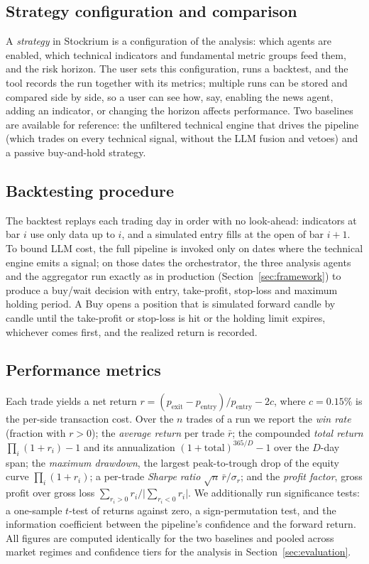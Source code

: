 \documentclass[runningheads]{llncs}
\begin{document}
\subsection{Strategy configuration and comparison}
A \emph{strategy} in Stockrium is a configuration of the analysis: which agents
are enabled, which technical indicators and fundamental metric groups feed them,
and the risk horizon. The user sets this configuration, runs a backtest, and the
tool records the run together with its metrics; multiple runs can be stored and
compared side by side, so a user can see how, say, enabling the news agent, adding
an indicator, or changing the horizon affects performance. Two baselines are
available for reference: the unfiltered technical engine that drives the pipeline
(which trades on every technical signal, without the LLM fusion and vetoes) and a
passive buy-and-hold strategy.

\subsection{Backtesting procedure}
The backtest replays each trading day in order with no look-ahead: indicators at
bar $i$ use only data up to $i$, and a simulated entry fills at the open of bar
$i{+}1$. To bound LLM cost, the full pipeline is invoked only on dates where the
technical engine emits a signal; on those dates the orchestrator, the three
analysis agents and the aggregator run exactly as in production
(Section~\ref{sec:framework}) to produce a buy/wait decision with entry,
take-profit, stop-loss and maximum holding period. A \textsf{Buy} opens a position
that is simulated forward candle by candle until the take-profit or stop-loss is
hit or the holding limit expires, whichever comes first, and the realized return
is recorded.

\subsection{Performance metrics}
Each trade yields a net return $r=(p_{\mathrm{exit}}-p_{\mathrm{entry}})/
p_{\mathrm{entry}}-2c$, where $c=0.15\%$ is the per-side transaction cost. Over the
$n$ trades of a run we report the \emph{win rate} (fraction with $r>0$); the
\emph{average return} per trade $\bar r$; the compounded \emph{total return}
$\prod_i(1+r_i)-1$ and its annualization $(1+\text{total})^{365/D}-1$ over the
$D$-day span; the \emph{maximum drawdown}, the largest peak-to-trough drop of the
equity curve $\prod_i(1+r_i)$; a per-trade \emph{Sharpe ratio}
$\sqrt{n}\,\bar r/\sigma_r$; and the \emph{profit factor}, gross profit over gross
loss $\sum_{r_i>0} r_i / \lvert\sum_{r_i<0} r_i\rvert$. We additionally run
significance tests: a one-sample $t$-test of returns against zero, a
sign-permutation test, and the information coefficient between the pipeline's
confidence and the forward return. All figures are computed identically for the
two baselines and pooled across market regimes and confidence tiers for the
analysis in Section~\ref{sec:evaluation}.
\end{document}
